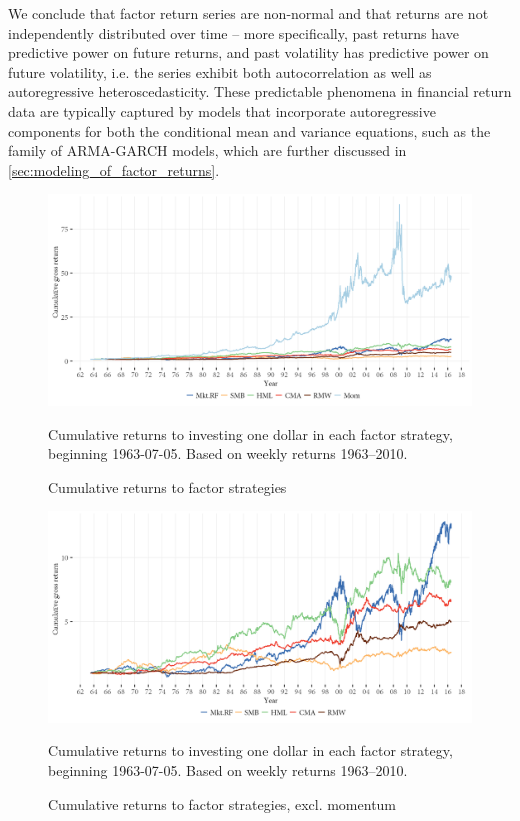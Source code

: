 We conclude that factor return series are non-normal and that returns are not independently distributed over time -- more specifically, past returns have predictive power on future returns, and past volatility has predictive power on future volatility, i.e. the series exhibit both autocorrelation as well as autoregressive heteroscedasticity. These predictable phenomena in financial return data are typically captured by models that incorporate autoregressive components for both the conditional mean and variance equations, such as the family of ARMA-GARCH models, which are further discussed in \autoref{sec:modeling_of_factor_returns}.
\begin{figure}[htbp]
  \centering
  \includegraphics[scale=1]{graphics/cumretPlot.png}  
  \footnotesize
  \caption{Cumulative returns to factor strategies}
  \begin{longcaption}
    Cumulative returns to investing one dollar in each factor strategy, beginning 1963-07-05. Based on weekly returns 1963--2010.
  \end{longcaption}
  \label{fig:cumret}
\end{figure}
\begin{figure}[htbp]
  \centering
  \includegraphics[scale=1]{graphics/cumretPlot_no_mom.png}  
  \footnotesize
  \caption{Cumulative returns to factor strategies, excl. momentum}
  \begin{longcaption}
    Cumulative returns to investing one dollar in each factor strategy, beginning 1963-07-05. Based on weekly returns 1963--2010.
  \end{longcaption}
  \label{fig:cumret_no_mom}
\end{figure}
